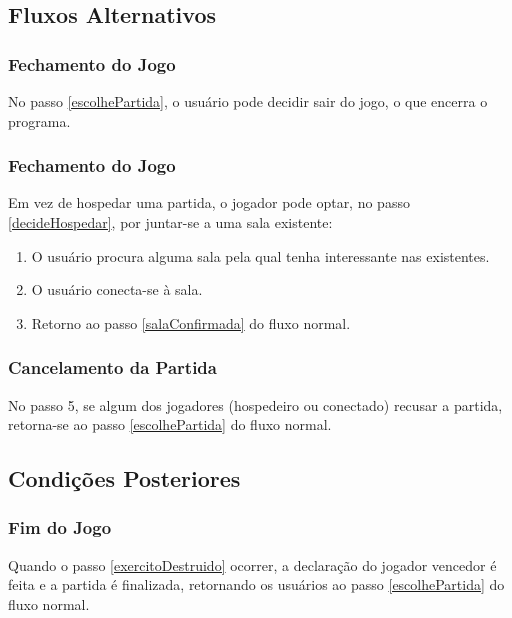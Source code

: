 \subsection{Fluxos Alternativos}

    \subsubsection{Fechamento do Jogo}
        No passo \ref{escolhePartida}, o usuário pode decidir sair do jogo, o que encerra o
        programa.

    \subsubsection{Fechamento do Jogo}
        Em vez de hospedar uma partida, o jogador pode optar, no passo \ref{decideHospedar},
        por juntar-se a uma sala existente:
        \begin{enumerate}
            \item O usuário procura alguma sala pela qual tenha interessante nas existentes.
            \item O usuário conecta-se à sala.
            \item Retorno ao passo \ref{salaConfirmada} do fluxo normal.
        \end{enumerate}

    \subsubsection{Cancelamento da Partida}
        No passo 5, se algum dos jogadores (hospedeiro ou conectado) recusar
        a partida, retorna-se ao passo \ref{escolhePartida} do fluxo normal.


\subsection{Condições Posteriores}
    \subsubsection{Fim do Jogo}
        Quando o passo \ref{exercitoDestruido} ocorrer, a declaração do jogador vencedor é feita
        e a partida é finalizada, retornando os usuários ao passo \ref{escolhePartida}
        do fluxo normal.
